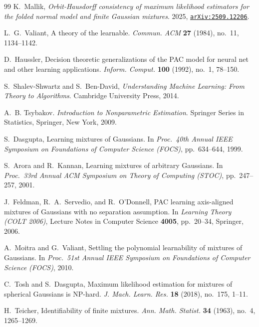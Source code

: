 \documentclass{article}
\theoremstyle{plain}
\theoremstyle{definition}
\theoremstyle{remark}
\numberwithin{equation}{section}
\begin{document}
\begin{thebibliography}{99}
K.~Mallik,
\emph{Orbit-Hausdorff consistency of maximum likelihood estimators for the folded normal model and finite Gaussian mixtures}.
2025, \href{https://arxiv.org/abs/2509.12206}{\texttt{arXiv:2509.12206}}.

L.~G.~Valiant,
A theory of the learnable.
\emph{Commun. ACM} \textbf{27} (1984), no.~11, 1134--1142.

D.~Haussler,
Decision theoretic generalizations of the {PAC} model for neural net and other learning applications.
\emph{Inform. Comput.} \textbf{100} (1992), no.~1, 78--150.

S.~Shalev-Shwartz and S.~Ben-David,
\emph{Understanding Machine Learning: From Theory to Algorithms}.
Cambridge University Press, 2014.

A.~B. Tsybakov.
\newblock \emph{Introduction to Nonparametric Estimation}.
\newblock Springer Series in Statistics, Springer, New York, 2009.

S.~Dasgupta,
Learning mixtures of {Gaussians}.
In \emph{Proc.\ 40th Annual IEEE Symposium on Foundations of Computer Science (FOCS)},
pp.~634--644, 1999.

S.~Arora and R.~Kannan,
Learning mixtures of arbitrary {Gaussians}.
In \emph{Proc.\ 33rd Annual ACM Symposium on Theory of Computing (STOC)},
pp.~247--257, 2001.

J.~Feldman, R.~A.~Servedio, and R.~O'Donnell,
{PAC} learning axis-aligned mixtures of {Gaussians} with no separation assumption.
In \emph{Learning Theory (COLT 2006)},
Lecture Notes in Computer Science \textbf{4005}, pp.~20--34,
Springer, 2006.

A.~Moitra and G.~Valiant,
Settling the polynomial learnability of mixtures of {Gaussians}.
In \emph{Proc.\ 51st Annual IEEE Symposium on Foundations of Computer Science (FOCS)},
2010.

C.~Tosh and S.~Dasgupta,
Maximum likelihood estimation for mixtures of spherical {Gaussians} is {NP}-hard.
\emph{J. Mach. Learn. Res.} \textbf{18} (2018), no.~175, 1--11.

H.~Teicher,
Identifiability of finite mixtures.
\emph{Ann. Math. Statist.} \textbf{34} (1963), no.~4, 1265--1269.


\end{thebibliography}
\end{document}
